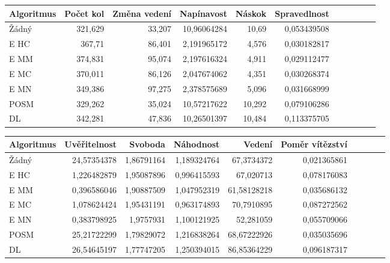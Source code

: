 \begin{table*}[b]\footnotesize
\vspace*{0mm}
\caption{{\label{tab-ludom}} Porovnání metrik zábavnosti u jednotlivých algoritmů ve hře Ludo. Metriky změna vedení a svoboda se maximalizují, zbytek minimalizuje.}
\vspace*{0mm}
\label{shadowtable}
\begin{center}
\begin{tabular}{| l || r | r | r | r | r | r | r | r | r | r |}
\hline
Algoritmus & Počet kol	& Změna vedení & Napínavost & Náskok & Spravedlnost\\
\hline
\hline
Žádný & 321,629 & 33,207 & 10,96064284 & 10,69 & 0,053439508 \\ \hline  
E HC & 367,71 & 86,401 & 2,191965172 & 4,576 & 0,030182817 \\ \hline  
E MM & 374,831 & 95,074 & 2,197616324 & 4,911 & 0,029112477 \\ \hline  
E MC & 370,011 & 86,126 & 2,047674062 & 4,351 & 0,030268374 \\ \hline  
E MN & 349,386 & 97,275 & 2,378575689 & 5,096 & 0,031668999 \\ \hline  
POSM & 329,262 & 35,024 & 10,57217622 & 10,292 & 0,079106286 \\ \hline  
DL & 342,281 & 47,836 & 10,26501397 & 10,484 & 0,113375705 \\ \hline  
\end{tabular}
\end{center}
\begin{center}
\begin{tabular}{| l || r | r | r | r | r | r | r | r | r |}
\hline
Algoritmus & Uvěřitelnost & Svoboda & Náhodnost & Vedení &	Poměr vítězství \\
\hline
\hline
Žádný & 24,57354378 & 1,86791164 & 1,189324764 & 67,3734372 & 0,021365861 \\ \hline  
E HC & 1,226482879 & 1,95087896 & 0,996415593 & 67,020713 & 0,078176083 \\ \hline  
E MM & 0,396586046 & 1,90887509 & 1,047952319 & 61,58128218 & 0,035686132 \\ \hline  
E MC & 1,078624424 & 1,95431191 & 0,963174893 & 70,7910895 & 0,087272562 \\ \hline  
E MN & 0,383798925 & 1,9757931 & 1,100121925 & 52,281059 & 0,055709066 \\ \hline  
POSM & 25,21722299 & 1,79829072 & 1,216838264 & 68,67222926 & 0,035035696 \\ \hline  
DL & 26,54645197 & 1,77747205 & 1,250394015 & 86,85364229 & 0,096187317 \\ \hline  
\end{tabular}
\end{center}
\end{table*}

